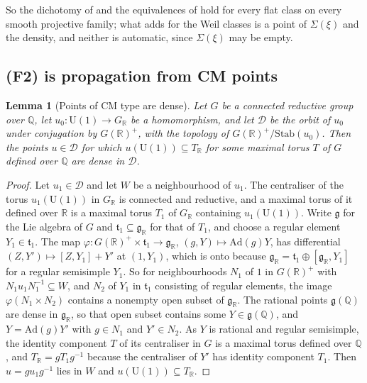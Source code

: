 \documentclass[11pt,reqno]{amsart}
\theoremstyle{plain}
\newtheorem{lemma}[theorem]{Lemma}
\theoremstyle{definition}
\theoremstyle{remark}
\newcommand{\QQ}{\mathbb{Q}}
\newcommand{\RR}{\mathbb{R}}
\newcommand{\cD}{\mathcal{D}}
\begin{document}
So the dichotomy of \cite[Theorem~1.1(iii)]{paperI} and the equivalences of
\cite[Theorem~1.1(iv)]{paperI} hold for every flat class on every smooth projective
family; what \cite[Theorem~1.1]{paperI} adds for the Weil classes is a point of
$\Sigma(\xi)$ and the density, and neither is automatic, since
$\Sigma(\xi)$ may be empty.

\subsection{(F2) is propagation from CM points}\label{ssec:f2cm}

\begin{lemma}[Points of CM type are dense]\label{lem:cmdense}
Let $G$ be a connected reductive group over $\QQ$, let
$u_{0}\colon\mathrm{U}(1)\to G_{\RR}$ be a homomorphism, and let $\cD$ be
the orbit of $u_{0}$ under conjugation by $G(\RR)^{+}$, with the topology of
$G(\RR)^{+}/\mathrm{Stab}(u_{0})$. Then the points $u\in\cD$ for which
$u(\mathrm{U}(1))\subseteq T_{\RR}$ for some maximal torus $T$ of $G$ defined
over $\QQ$ are dense in $\cD$.
\end{lemma}

\begin{proof}
Let $u_{1}\in\cD$ and let $W$ be a neighbourhood of $u_{1}$. The centraliser
of the torus $u_{1}(\mathrm{U}(1))$ in $G_{\RR}$ is connected and reductive,
and a maximal torus of it defined over $\RR$ is a maximal torus $T_{1}$ of
$G_{\RR}$ containing $u_{1}(\mathrm{U}(1))$. Write $\mathfrak{g}$ for the Lie
algebra of $G$ and $\mathfrak{t}_{1}\subseteq\mathfrak{g}_{\RR}$ for that of
$T_{1}$, and choose a regular element $Y_{1}\in\mathfrak{t}_{1}$. The map
$\varphi\colon G(\RR)^{+}\times\mathfrak{t}_{1}\to\mathfrak{g}_{\RR}$,
$(g,Y)\mapsto\mathrm{Ad}(g)Y$, has differential
$(Z,Y')\mapsto[Z,Y_{1}]+Y'$ at $(1,Y_{1})$, which is onto because
$\mathfrak{g}_{\RR}=\mathfrak{t}_{1}\oplus[\mathfrak{g}_{\RR},Y_{1}]$ for a
regular semisimple $Y_{1}$. So for neighbourhoods $N_{1}$ of $1$ in
$G(\RR)^{+}$ with $N_{1}u_{1}N_{1}^{-1}\subseteq W$, and $N_{2}$ of $Y_{1}$
in $\mathfrak{t}_{1}$ consisting of regular elements, the image
$\varphi(N_{1}\times N_{2})$ contains a nonempty open subset of
$\mathfrak{g}_{\RR}$. The rational points $\mathfrak{g}(\QQ)$ are dense in
$\mathfrak{g}_{\RR}$, so that open subset contains some
$Y\in\mathfrak{g}(\QQ)$, and $Y=\mathrm{Ad}(g)Y'$ with $g\in N_{1}$ and
$Y'\in N_{2}$. As $Y$ is rational and regular semisimple, the identity
component $T$ of its centraliser in $G$ is a maximal torus defined over
$\QQ$, and $T_{\RR}=gT_{1}g^{-1}$ because the centraliser of $Y'$ has
identity component $T_{1}$. Then $u=gu_{1}g^{-1}$ lies in $W$ and
$u(\mathrm{U}(1))\subseteq T_{\RR}$.
\end{proof}
\end{document}
